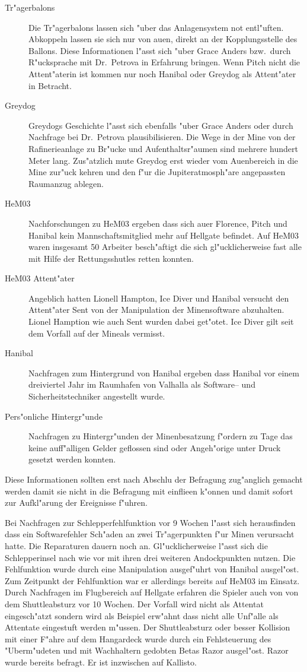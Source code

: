 \begin{description}
	\item[Tr"agerbalons] Die Tr"agerbalons lassen sich "uber das Anlagensystem not entl"uften. Abkoppeln lassen sie sich nur von au\3en, 
		direkt an der Kopplungsstelle des Ballons. Diese Informationen l"asst sich "uber Grace Anders bzw.~durch R"ucksprache mit Dr.~Petrova in Erfahrung bringen. Wenn Pitch nicht die Attent"aterin ist kommen nur noch Hanibal oder Greydog als Attent"ater in Betracht.
	\item[Greydog] Greydogs Geschichte l"asst sich ebenfalls "uber Grace Anders oder durch Nachfrage bei Dr.~Petrova plausibilisieren. Die 
		Wege in der Mine von der Rafinerieanlage zu Br"ucke und Aufenthaltsr"aumen sind mehrere hundert Meter lang. Zus"atzlich mu\3te Greydog erst wieder vom Au\3enbereich in die Mine zur"uck kehren und den f"ur die Jupiteratmosph"are angepassten Raumanzug ablegen.
	\item[HeM03] Nachforschungen zu HeM03 ergeben dass sich au\3er Florence, Pitch und Hanibal kein Mannschaftsmitglied mehr auf Hellgate befindet. Auf HeM03 waren insgesamt 50 Arbeiter besch"aftigt die sich gl"ucklicherweise fast alle mit Hilfe der Rettungsshutles retten konnten. 
	\item[HeM03 Attent"ater] Angeblich hatten Lionell Hampton, Ice Diver und Hanibal versucht den Attent"ater Sent von der Manipulation der 
		Minensoftware abzuhalten. Lionel Hamption wie auch Sent wurden dabei get"otet. Ice Diver gilt seit dem Vorfall auf der Mineals vermisst.
	\item[Hanibal] Nachfragen zum Hintergrund von Hanibal ergeben dass Hanibal vor einem dreiviertel Jahr im Raumhafen von Valhalla als 
		Software-- und Sicherheitstechniker angestellt wurde.
	\item[Pers"onliche Hintergr"unde] Nachfragen zu Hintergr"unden der Minenbesatzung f"ordern zu Tage das keine auff"alligen Gelder 
		geflossen sind oder Angeh"orige unter Druck gesetzt werden konnten.
\end{description}

Diese Informationen sollten erst nach Abschlu\3 der Befragung zug"anglich gemacht werden damit sie nicht in die Befragung mit einflie\3en k"onnen und damit sofort zur Aufkl"arung der Ereignisse f"uhren.

Bei Nachfragen zur Schlepperfehlfunktion vor 9 Wochen l"asst sich herausfinden dass ein Softwarefehler Sch"aden an zwei Tr"agerpunkten f"ur Minen verursacht hatte. Die Reparaturen dauern noch an. Gl"ucklicherweise l"asst sich die Schlepperinsel nach wie vor mit ihren drei weiteren Andockpunkten nutzen. Die Fehlfunktion wurde durch eine Manipulation ausgef"uhrt von Hanibal ausgel"ost. Zum Zeitpunkt der Fehlfunktion war er allerdings bereits auf HeM03 im Einsatz. Durch Nachfragen im Flugbereich auf Hellgate erfahren die Spieler auch von von dem Shuttleabsturz vor 10 Wochen. Der Vorfall wird nicht als Attentat eingesch"atzt sondern wird als Beispiel erw"ahnt dass nicht alle Unf"alle als Attentate eingestuft werden m"ussen. Der Shuttleabsturz oder besser Kollision mit einer F"ahre auf dem Hangardeck wurde durch ein Fehlsteuerung des "Uberm"udeten und mit Wachhaltern gedobten Betas Razor ausgel"ost. Razor wurde bereits befragt. Er ist inzwischen auf Kallisto.

